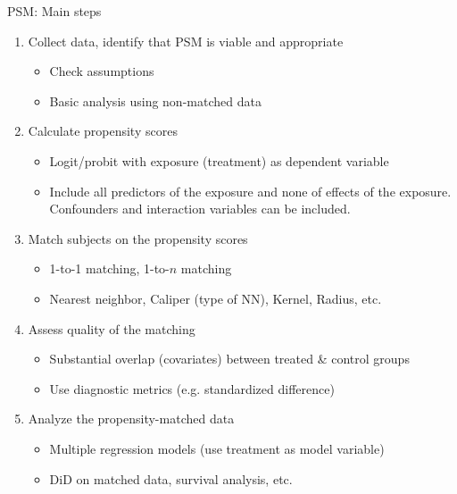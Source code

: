 \documentclass{beamer}
\begin{document}
\begin{frame}{PSM: Main steps}
\begin{enumerate}
    \item Collect data, identify that PSM is viable and appropriate
        \begin{itemize}
            \item Check assumptions
            \item Basic analysis using non-matched data
        \end{itemize}
    \item Calculate propensity scores
        \begin{itemize}
            \item Logit/probit with exposure (treatment) as dependent variable
            \item Include all predictors of the exposure and none of effects of the exposure. Confounders and interaction variables can be included.
        \end{itemize}
    \item Match subjects on the propensity scores
        \begin{itemize}
            \item 1-to-1 matching, 1-to-$n$ matching
            \item Nearest neighbor, Caliper (type of NN), Kernel, Radius, etc.
        \end{itemize}
    \item Assess quality of the matching\\
        \begin{itemize}
            \item Substantial overlap (covariates) between treated \& control groups
            \item Use diagnostic metrics (e.g. standardized difference)
        \end{itemize}
    \item Analyze the propensity-matched data
        \begin{itemize}
            \item Multiple regression models (use treatment as model variable) 
            \item DiD on matched data, survival analysis, etc.
        \end{itemize}
\end{enumerate}
\end{frame}
\end{document}
